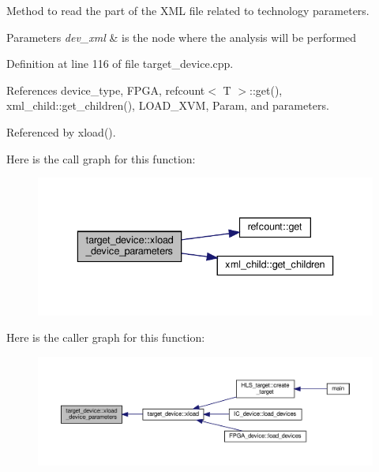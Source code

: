 Method to read the part of the X\+ML file related to technology parameters. 


\begin{DoxyParams}{Parameters}
{\em dev\+\_\+xml} & is the node where the analysis will be performed \\
\hline
\end{DoxyParams}


Definition at line 116 of file target\+\_\+device.\+cpp.



References device\+\_\+type, F\+P\+GA, refcount$<$ T $>$\+::get(), xml\+\_\+child\+::get\+\_\+children(), L\+O\+A\+D\+\_\+\+X\+VM, Param, and parameters.



Referenced by xload().

Here is the call graph for this function\+:
\nopagebreak
\begin{figure}[H]
\begin{center}
\leavevmode
\includegraphics[width=336pt]{d9/dd8/classtarget__device_ad6cfdaa73e795c5c7901c482ead7d5e7_cgraph}
\end{center}
\end{figure}
Here is the caller graph for this function\+:
\nopagebreak
\begin{figure}[H]
\begin{center}
\leavevmode
\includegraphics[width=350pt]{d9/dd8/classtarget__device_ad6cfdaa73e795c5c7901c482ead7d5e7_icgraph}
\end{center}
\end{figure}
\mbox{\label{classtarget__device_adddcd8f3eed98d93007b4ebc68be2f82}} 
